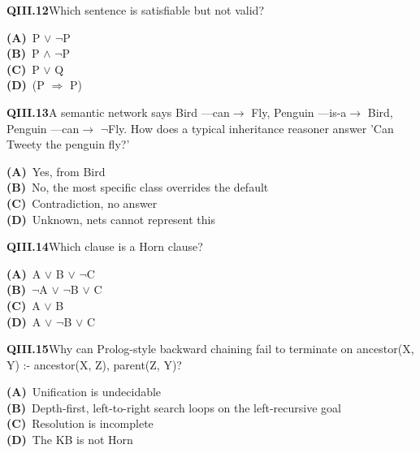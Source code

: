 \documentclass[11pt]{article}
\begin{document}
\begin{tcolorbox}[enhanced,breakable,colback=white,colframe=navyL,arc=2mm,boxrule=0.7pt,left=3mm,right=3mm,top=2mm,bottom=2mm]
\textbf{\color{navy}QIII.12}\quad Which sentence is satisfiable but not valid?\hfill{}\par\smallskip
{\small \textbf{\color{navyL}(A)}\ P $\vee$ $\neg$P\\[1pt]\textbf{\color{navyL}(B)}\ P $\wedge$ $\neg$P\\[1pt]\textbf{\color{navyL}(C)}\ P $\vee$ Q\\[1pt]\textbf{\color{navyL}(D)}\ (P $\Rightarrow$ P)}
\end{tcolorbox}
\begin{tcolorbox}[enhanced,breakable,colback=white,colframe=navyL,arc=2mm,boxrule=0.7pt,left=3mm,right=3mm,top=2mm,bottom=2mm]
\textbf{\color{navy}QIII.13}\quad A semantic network says Bird ---can$\to$ Fly, Penguin ---is-a$\to$ Bird, Penguin ---can$\to$ $\neg$Fly. How does a typical inheritance reasoner answer 'Can Tweety the penguin fly?'\hfill{}\par\smallskip
{\small \textbf{\color{navyL}(A)}\ Yes, from Bird\\[1pt]\textbf{\color{navyL}(B)}\ No, the most specific class overrides the default\\[1pt]\textbf{\color{navyL}(C)}\ Contradiction, no answer\\[1pt]\textbf{\color{navyL}(D)}\ Unknown, nets cannot represent this}
\end{tcolorbox}
\begin{tcolorbox}[enhanced,breakable,colback=white,colframe=navyL,arc=2mm,boxrule=0.7pt,left=3mm,right=3mm,top=2mm,bottom=2mm]
\textbf{\color{navy}QIII.14}\quad Which clause is a Horn clause?\hfill{}\par\smallskip
{\small \textbf{\color{navyL}(A)}\ A $\vee$ B $\vee$ $\neg$C\\[1pt]\textbf{\color{navyL}(B)}\ $\neg$A $\vee$ $\neg$B $\vee$ C\\[1pt]\textbf{\color{navyL}(C)}\ A $\vee$ B\\[1pt]\textbf{\color{navyL}(D)}\ A $\vee$ $\neg$B $\vee$ C}
\end{tcolorbox}
\begin{tcolorbox}[enhanced,breakable,colback=white,colframe=navyL,arc=2mm,boxrule=0.7pt,left=3mm,right=3mm,top=2mm,bottom=2mm]
\textbf{\color{navy}QIII.15}\quad Why can Prolog-style backward chaining fail to terminate on ancestor(X, Y) :- ancestor(X, Z), parent(Z, Y)?\hfill{}\par\smallskip
{\small \textbf{\color{navyL}(A)}\ Unification is undecidable\\[1pt]\textbf{\color{navyL}(B)}\ Depth-first, left-to-right search loops on the left-recursive goal\\[1pt]\textbf{\color{navyL}(C)}\ Resolution is incomplete\\[1pt]\textbf{\color{navyL}(D)}\ The KB is not Horn}
\end{tcolorbox}
\newpage
\end{document}
